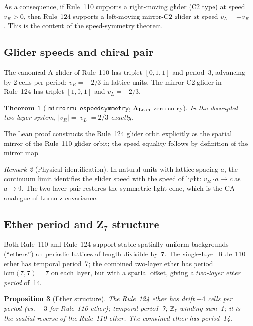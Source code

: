 \documentclass[11pt]{article}
\newtheorem{theorem}{Theorem}[section]
\newtheorem{proposition}[theorem]{Proposition}
\theoremstyle{remark}
\newtheorem{remark}[theorem]{Remark}
\newcommand{\ZS}{\mathbb{Z}_7}
\newcommand{\lean}[1]{%
  \penalty-100
  \begingroup\def\_{\textunderscore\allowbreak}\texttt{#1}\endgroup}
\newcommand{\CatAL}{\ensuremath{\textbf{A}_{\rm Lean}}}
\begin{document}
As a consequence, if Rule~110 supports a right-moving glider (C2 type)
at speed $v_R>0$, then Rule~124 supports a left-moving mirror-C2 glider
at speed $v_L=-v_R$.  This is the content of the speed-symmetry theorem.

\subsection{Glider speeds and chiral pair}
\label{ssec:speeds}

The canonical A-glider of Rule~110 has triplet $[0,1,1]$ and period~3,
advancing by 2 cells per period: $v_R=+2/3$ in lattice units.
The mirror C2 glider in Rule~124 has triplet $[1,0,1]$ and
$v_L=-2/3$.

\begin{theorem}[\lean{mirror\_rule\_speed\_symmetry}; \CatAL{} zero sorry]
  \label{thm:speeds}
  In the decoupled two-layer system, $|v_R|=|v_L|=2/3$ exactly.
\end{theorem}

The Lean proof constructs the Rule~124 glider orbit explicitly as the spatial
mirror of the Rule~110 glider orbit; the speed equality follows by definition
of the mirror map.

\begin{remark}[Physical identification]
  In natural units with lattice spacing $a$, the continuum limit identifies
  the glider speed with the speed of light: $v_R\cdot a\to c$ as $a\to0$.
  The two-layer pair restores the symmetric light cone, which is the CA
  analogue of Lorentz covariance.
\end{remark}

\subsection{Ether period and Z\texorpdfstring{$_7$}{7} structure}
\label{ssec:ether}

Both Rule~110 and Rule~124 support stable spatially-uniform backgrounds
(``ethers'') on periodic lattices of length divisible by~7.  The single-layer
Rule~110 ether has temporal period~7; the combined two-layer ether has period
$\mathrm{lcm}(7,7)=7$ on each layer, but with a spatial offset, giving a
\emph{two-layer ether period} of~14.

\begin{proposition}[Ether structure]
  \label{prop:ether}
  The Rule~124 ether has drift $+4$ cells per period (vs.\ $+3$ for
  Rule~110 ether); temporal period~7; $\ZS$ winding sum~1; it is the
  spatial reverse of the Rule~110 ether.  The combined ether has period~14.
\end{proposition}
\end{document}
